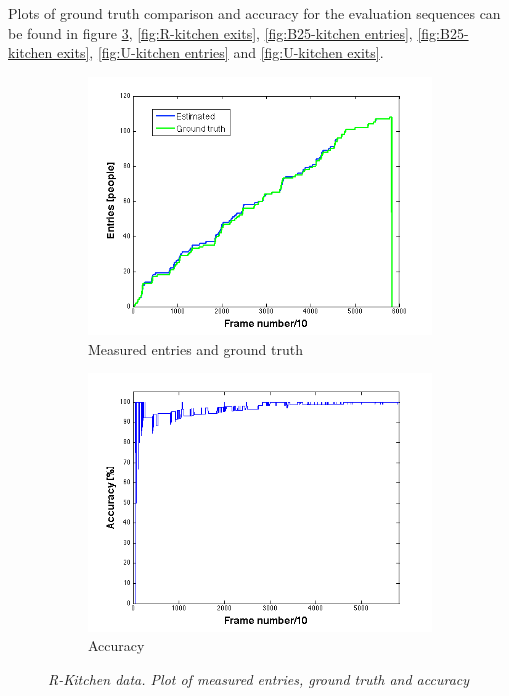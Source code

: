Plots of ground truth comparison and accuracy for the evaluation sequences can be found in figure \ref{fig:R-kitchen entries}, \ref{fig:R-kitchen exits}, \ref{fig:B25-kitchen entries}, \ref{fig:B25-kitchen exits}, \ref{fig:U-kitchen entries} and \ref{fig:U-kitchen exits}.
\newpage
\begin{figure}[H]
\centering
\begin{subfigure}{.5\textwidth}
  \centering
  \includegraphics[width=1.1\linewidth]{images/EntriesTest.png}
  \caption{Measured entries and ground truth}
  \label{fig:sub1}
\end{subfigure}%
\begin{subfigure}{.5\textwidth}
  \centering
  \includegraphics[width=1.1\linewidth]{images/AccEntriesTest.png}
  \caption{Accuracy}
  \label{fig:sub2}
\end{subfigure}
\caption[R-kitchen entries]{\textit{R-Kitchen data. Plot of measured entries, ground truth and accuracy}}
\label{fig:R-kitchen entries}
\end{figure}

